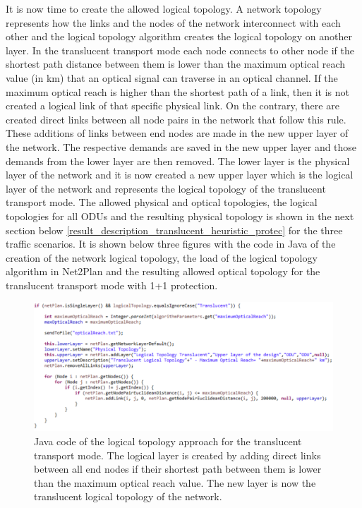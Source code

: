 \vspace{11pt}
It is now time to create the allowed logical topology. A network topology represents how the links and the nodes of the network interconnect with each other and the logical topology algorithm creates the logical topology on another layer. In the translucent transport mode each node connects to other node if the shortest path distance between them is lower than the maximum optical reach value (in km) that an optical signal can traverse in an optical channel. If the maximum optical reach is higher than the shortest path of a link, then it is not created a logical link of that specific physical link. On the contrary, there are created direct links between all node pairs in the network that follow this rule. These additions of links between end nodes are made in the new upper layer of the network. The respective demands are saved in the new upper layer and those demands from the lower layer are then removed. The lower layer is the physical layer of the network and it is now created a new upper layer which is the logical layer of the network and represents the logical topology of the translucent transport mode.
The allowed physical and optical topologies, the logical topologies for all ODUs and the resulting physical topology is shown in the next section below \ref{result_description_translucent_heuristic_protec} for the three traffic scenarios. It is shown below three figures with the code in Java of the creation of the network logical topology, the load of the logical topology algorithm in Net2Plan and the resulting allowed optical topology for the translucent transport mode with 1+1 protection.

\begin{figure}[H]
\centering
\includegraphics[width=17cm]{sdf/heuristic/translucent_protection/figures/logical_topology_creation_translucent}
\caption{Java code of the logical topology approach for the translucent transport mode. The logical layer is created by adding direct links between all end nodes if their shortest path between them is lower than the maximum optical reach value. The new layer is now the translucent logical topology of the network.}
\label{logical_topology_creation_translucent_protec}
\end{figure}

